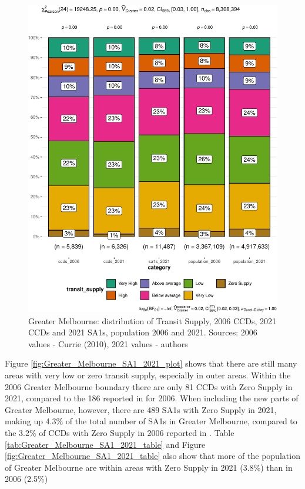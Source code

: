 \documentclass[preprint, 3p,
authoryear]{elsarticle} %
\begin{document}
\begin{figure}
\centering
\includegraphics{Leveraging_GTFS_to_assess_transit_supply_Transport_Geography_files/figure-latex/Greater_Melbourne_SA1_2021_table-1.pdf}
\caption{Greater Melbourne: distribution of Transit Supply, 2006 CCDs,
2021 CCDs and 2021 SA1s, population 2006 and 2021. Sources: 2006 values
- Currie (2010), 2021 values - authors}
\end{figure}

Figure \ref{fig:Greater_Melbourne_SA1_2021_plot} shows that there are
still many areas with very low or zero transit supply, especially in
outer areas. Within the 2006 Greater Melbourne boundary there are only
81 CCDs with Zero Supply in 2021, compared to the 186 reported in
\citet{currie2010identifying} for 2006. When including the new parts of
Greater Melbourne, however, there are 489 SA1s with Zero Supply in 2021,
making up 4.3\% of the total number of SA1s in Greater Melbourne,
compared to the 3.2\% of CCDs with Zero Supply in 2006 reported in
\citet{currie2010identifying}. Table
\ref{tab:Greater_Melbourne_SA1_2021_table} and Figure
\ref{fig:Greater_Melbourne_SA1_2021_table} also show that more of the
population of Greater Melbourne are within areas with Zero Supply in
2021 (3.8\%) than in 2006 (2.5\%)
\end{document}
